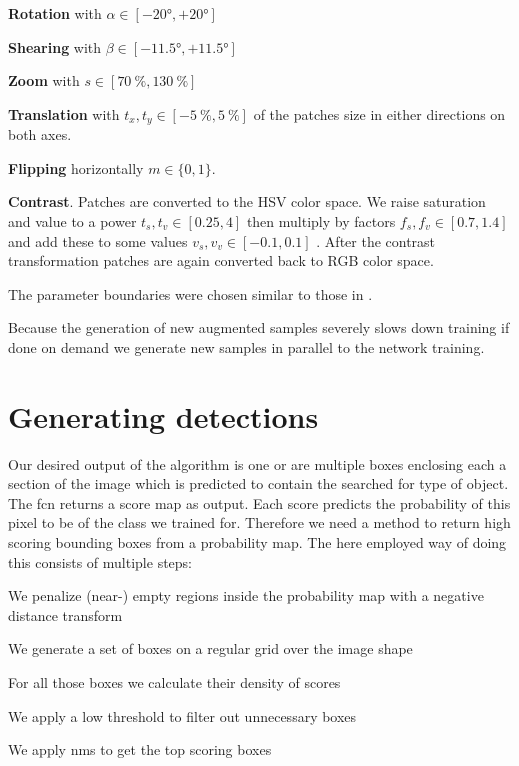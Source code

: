 \begin{my_list_item}
    \item \textbf{Rotation} with $\alpha\in[-\ang{20}, +\ang{20}]$
    \item \textbf{Shearing} with $\beta\in[-\ang{11.5}, + \ang{11.5}]$
    \item \textbf{Zoom} with $s\in[\SI{70}{\percent}, \SI{130}{\percent}]$
    \item \textbf{Translation} with $t_x,t_y\in[-\SI{5}{\percent}, \SI{5}{\percent}]$ of the patches size in either directions on both axes.
    \item \textbf{Flipping} horizontally $m\in\{0,1\}$.
    \item \textbf{Contrast}. Patches are converted to the HSV color space. We raise saturation and value to a power $t_s, t_v \in [0.25, 4]$ then multiply by factors $f_s, f_v \in [0.7, 1.4]$ and add these to some values $v_s, v_v \in [-0.1, 0.1]$ \citep{dosovitskiy_discriminative_2014}. After the contrast transformation patches are again converted back to RGB color space.
\end{my_list_item}
The parameter boundaries were chosen similar to those in \citet{dosovitskiy_discriminative_2014}.

Because the generation of new augmented samples severely slows down training if done on demand we generate new samples in parallel to the network training.


\section{Generating detections}
\label{sec:pipeline:eval}
Our desired output of the algorithm is one or are multiple boxes enclosing each a section of the image which is predicted to contain the searched for type of object. The \gls{fcn} returns a score map as output. Each score predicts the probability of this pixel to be of the class we trained for. Therefore we need a method to return high scoring bounding boxes from a probability map. The here employed way of doing this consists of multiple steps:\\
\begin{my_list_num}
    \item We penalize (near-) empty regions inside the probability map with a negative distance transform
    \item We generate a set of boxes on a regular grid over the image shape
    \item For all those boxes we calculate their density of scores
    \item We apply a low threshold to filter out unnecessary boxes
    \item We apply \gls{nms} to get the top scoring boxes
\end{my_list_num}

